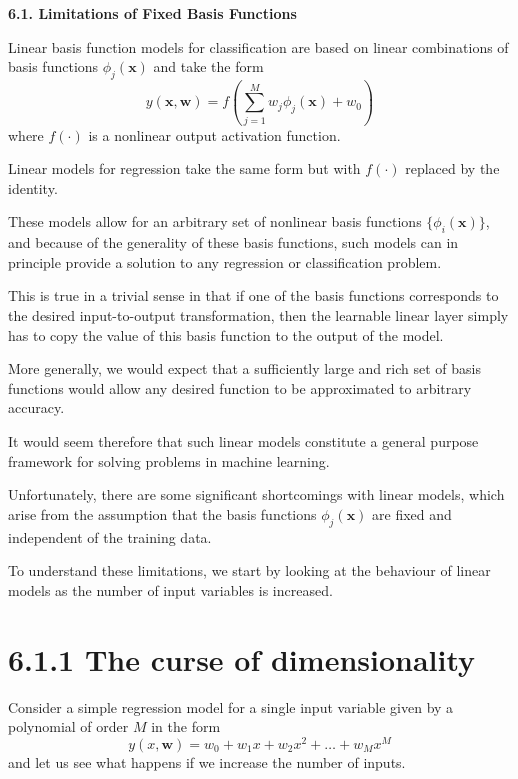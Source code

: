 \documentclass{article}
\begin{document}
\textbf{6.1. Limitations of Fixed Basis Functions}

Linear basis function models for classification are based on linear combinations of basis functions $\phi_j(\mathbf{x})$ and take the form
\begin{equation}
y(\mathbf{x}, \mathbf{w}) = f\left( \sum_{j=1}^{M} w_j \phi_j(\mathbf{x}) + w_0 \right)
\end{equation}
where $f(\cdot)$ is a nonlinear output activation function. 

Linear models for regression take the same form but with $f(\cdot)$ replaced by the identity. 

These models allow for an arbitrary set of nonlinear basis functions $\{\phi_i(\mathbf{x})\}$, and because of the generality of these basis functions, such models can in principle provide a solution to any regression or classification problem. 

This is true in a trivial sense in that if one of the basis functions corresponds to the desired input-to-output transformation, then the learnable linear layer simply has to copy the value of this basis function to the output of the model.

More generally, we would expect that a sufficiently large and rich set of basis functions would allow any desired function to be approximated to arbitrary accuracy. 

It would seem therefore that such linear models constitute a general purpose framework for solving problems in machine learning. 

Unfortunately, there are some significant shortcomings with linear models, which arise from the assumption that the basis functions $\phi_j(\mathbf{x})$ are fixed and independent of the training data. 

To understand these limitations, we start by looking at the behaviour of linear models as the number of input variables is increased.

\section{6.1.1 The curse of dimensionality}

Consider a simple regression model for a single input variable given by a polynomial of order $M$ in the form
\begin{equation}
y(x, \mathbf{w}) = w_0 + w_1 x + w_2 x^2 + \ldots + w_M x^M
\end{equation}
and let us see what happens if we increase the number of inputs. 
\end{document}
